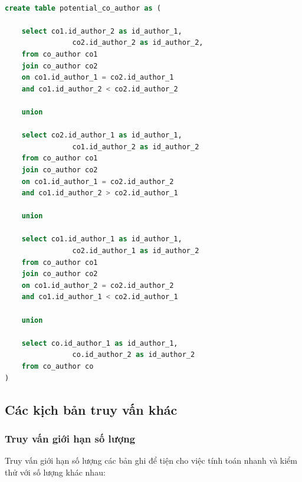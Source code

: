 \documentclass{article}
\begin{document}
\begin{lstlisting}[language=SQL, caption=Ứng viên đồng tác giả]

create table potential_co_author as (

	select co1.id_author_2 as id_author_1,
				co2.id_author_2 as id_author_2,
	from co_author co1
	join co_author co2
	on co1.id_author_1 = co2.id_author_1
	and co1.id_author_2 < co2.id_author_2
	
	union
	
	select co2.id_author_1 as id_author_1,
				co1.id_author_2 as id_author_2
	from co_author co1
	join co_author co2
	on co1.id_author_1 = co2.id_author_2
	and co1.id_author_2 > co2.id_author_1
	
	union
	
	select co1.id_author_1 as id_author_1,
				co2.id_author_1 as id_author_2
	from co_author co1
	join co_author co2
	on co1.id_author_2 = co2.id_author_2
	and co1.id_author_1 < co2.id_author_1
	
	union
	
	select co.id_author_1 as id_author_1,
				co.id_author_2 as id_author_2
	from co_author co
)

\end{lstlisting}

\subsection{Các kịch bản truy vấn khác}

\subsubsection{Truy vấn giới hạn số lượng}

\indent Truy vấn giới hạn số lượng các bản ghi để tiện cho việc tính toán nhanh và kiểm thử với số lượng khác nhau:
\end{document}
